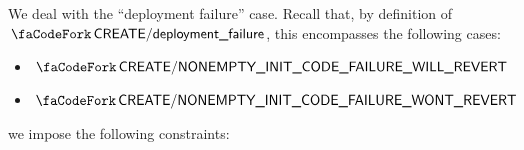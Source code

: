 \begin{center}
\end{center}
We deal with the ``deployment failure'' case. Recall that, by definition of $\scenCreateFailure$, this encompasses the following cases:
\begin{itemize}
	\item $\scenCreateNonEmptyInitCodeFailureWillRevert$
	\item $\scenCreateNonEmptyInitCodeFailureWontRevert$
\end{itemize}
we impose the following constraints:
